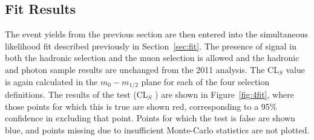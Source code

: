 \subsection{Fit Results}

The event yields from the previous section are then entered into the simultaneous likelihood fit described previously in Section~\ref{sec:fit}. The presence of signal in both the hadronic selection and the muon selection is allowed and the hadronic and photon sample results are unchanged from the 2011 analysis. The CL$_{S}$ value is again calculated in the $m_{0}-m_{1/2}$ plane for each of the four selection definitions. The results of the test (CL$_{S}$ ) are shown in Figure~\ref{fig:4fit}, where those points for which this is true are shown red, corresponding to a 95\% confidence in excluding that point. Points for which the test is false are shown blue, and points missing due to insufficient Monte-Carlo statistics are not plotted. 



